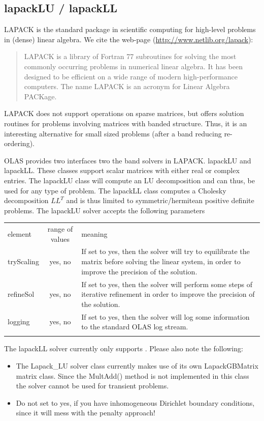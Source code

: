 \subsection{lapackLU / lapackLL}
%
%
LAPACK is the standard package in scientific computing for high-level problems
in (dense) linear algebra. We cite the web-page
(\url{http://www.netlib.org/lapack}):
%
%
\begin{quote}
LAPACK is a library of Fortran 77 subroutines for solving the most commonly
occurring problems in numerical linear algebra. It has been designed to be
efficient on a wide range of modern high-performance computers. The name LAPACK
is an acronym for Linear Algebra PACKage.
\end{quote}
%
%
LAPACK does not support operations on sparse matrices, but offers solution
routines for problems involving matrices with banded structure. Thus, it is
an interesting alternative for small sized problems (after a band reducing
re-ordering).

OLAS provides two interfaces two the band solvers in LAPACK. lapackLU and
lapackLL. These classes support scalar matrices with either real or complex
entries. The lapackLU class will compute an LU decomposition and can thus, be
used for any type of problem. The lapackLL class computes a Cholesky
decomposition $LL^T$ and is thus limited to symmetric/hermitean positive
definite problems. The lapackLU solver accepts the following parameters
%
%
\begin{center}
\begin{tabular}{lcp{}}
\hline\noalign{\smallskip}
element & range of values & meaning \\
\noalign{\smallskip}\hline\noalign{\smallskip}
tryScaling & yes, no & If set to yes, then the solver will try to equilibrate
                       the matrix before solving the linear system, in order
                       to improve the precision of the solution.\\
\noalign{\smallskip}\hline\noalign{\smallskip}
refineSol  & yes, no & If set to yes, then the solver will perform some steps
                       of iterative refinement in order to improve the
                       precision of the solution.\\
\noalign{\smallskip}\hline\noalign{\smallskip}
logging    & yes, no & If set to yes, then the solver will log some information
                       to the standard OLAS log stream.\\
\noalign{\smallskip}\hline
\end{tabular}
\end{center}
%
%
The lapackLL solver currently only supports . Please also note
the following:
%
%
\begin{itemize}
\item The Lapack\_LU solver class currently makes use of its own LapackGBMatrix
      matrix class. Since the MultAdd() method is not implemented in this class
      the solver cannot be used for transient problems.
\item Do not set  to yes, if you have inhomogeneous Dirichlet
      boundary conditions, since it will mess with the penalty approach!
\end{itemize}
%
%
